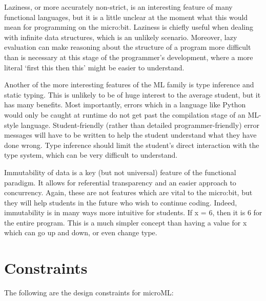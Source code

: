 \documentclass[12pt, a4paper]{report}
\begin{document}
Laziness, or more accurately non-\gls{strict}, is an interesting feature of many functional languages, 
but it is a little unclear at the moment what this would mean for programming on the micro:bit. 
Laziness is chiefly useful when dealing with infinite data structures, which is an unlikely
scenario. Moreover, lazy evaluation can make reasoning about the structure of a program more
difficult than is necessary at this stage of the programmer's development, where a more literal
`first this then this' might be easier to understand. 

Another of the more interesting features of the ML family is type inference and static typing.
This is unlikely to be of huge interest to the average student, but it has many benefits. Most
importantly, errors which in a language like Python would only be caught at runtime do not get
past the compilation stage of an ML-style language. Student-friendly (rather than detailed
programmer-friendly) error messages will have to be written to help the student understand what they
have done wrong. Type inference should limit the student's direct interaction with the type system,
which can be very difficult to understand.

Immutability of data is a key (but not universal) feature of the functional paradigm. It allows for
referential transparency and an easier approach to concurrency. Again, these are not features which
are vital to the micro:bit, but they will help students in the future who wish to continue 
coding. Indeed, immutability is in many ways more intuitive for students. If x = 6, then it is 6 for
the entire program. This is a much simpler concept than having a value for x which can go up and down,
or even change type.

\section{Constraints}
The following are the design constraints for microML:
\end{document}
